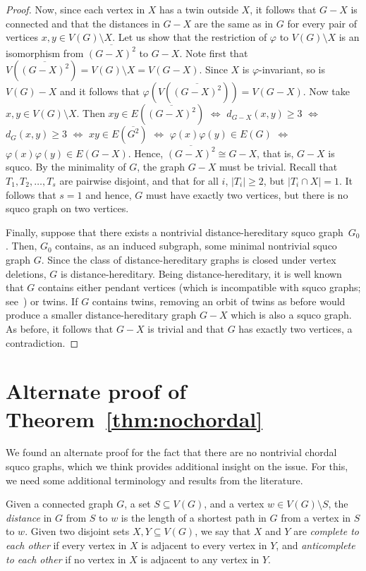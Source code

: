 \documentclass[12pt]{article}
\newcommand{\sq}[1]{\overline{#1^2}}
\begin{document}
\begin{proof}
  Now, since each vertex in $X$ has a twin outside $X$, it follows that $G-X$ is connected and that the distances in $G-X$ are the same as in $G$ for every pair of vertices $x,y\in V(G) \setminus X$. 
  Let us show that the restriction of $\varphi$ to $V(G)\setminus X$ is an isomorphism from $\sq{(G-X)}$ to $G-X$. 
  Note first that $V\left(\sq{(G-X)}\right)=V(G) \setminus X =V(G-X)$. Since $X$ is $\varphi$-invariant, so is $V(G)-X$ and it follows that  $\varphi\left(V\left(\sq{(G-X)}\right)\right)=V(G-X)$. 
  Now take $x,y\in V(G) \setminus X$. 
  Then $xy\in E\left(\sq{(G-X)}\right)$ $\iff$
    $d_{G-X}(x,y)\geq 3$ $\iff$ $d_{G}(x,y)\geq 3$ $\iff$
        $xy\in E(\sq{G})$ $\iff$ $\varphi(x)\varphi(y)\in E(G)$ $\iff$
            $\varphi(x)\varphi(y)\in E(G-X)$.  
        Hence, $\sq{(G-X)}\cong G-X$, that is, $G-X$ is squco.  
        By the minimality of $G$, the graph $G-X$ must be trivial.  
        Recall that $T_{1}, T_{2},\ldots, T_{s}$ are pairwise disjoint, and that for all $i$, $|T_{i}|\geq 2$, but $|T_{i}\cap X| = 1$.  
            It follows that $s=1$ and hence, $G$            must have exactly two vertices, but there is no squco graph on two vertices.

  Finally, suppose that there exists a nontrivial distance-hereditary squco graph~$G_0$. Then, $G_0$ contains, as an induced subgraph, some minimal nontrivial squco graph $G$. 
Since the class of distance-hereditary graphs is closed under vertex deletions, $G$ is distance-hereditary. 
  Being distance-hereditary, it is well known that $G$
  contains either pendant vertices (which is incompatible with squco graphs; see~\cite{BST94}) or twins. 
  If $G$ contains twins, removing an orbit of twins as before would produce a smaller distance-hereditary graph $G-X$ which is also a squco graph. 
  As before, it follows that $G-X$ is trivial and that $G$ has exactly two vertices, a contradiction.
\end{proof}

\section{Alternate proof of Theorem~\ref{thm:nochordal}}

We found an alternate proof for the fact that there are no nontrivial chordal squco graphs, which we think provides additional insight on the issue. 
For this, we need some additional terminology and results from the literature.

Given a connected graph $G$, a set $S\subseteq V(G)$, and a vertex $w\in V(G)\setminus S$, the \emph{distance} in $G$ from $S$ to $w$ is the length of a shortest path in $G$ from a vertex in $S$ to $w$. 
Given two disjoint sets $X,Y\subseteq V(G)$, we say that $X$ and $Y$ are \emph{complete to each other} if every vertex in $X$ is adjacent to every vertex in $Y$, and \emph{anticomplete to each other} if no vertex in $X$ is adjacent to any vertex in $Y$.
\end{document}
